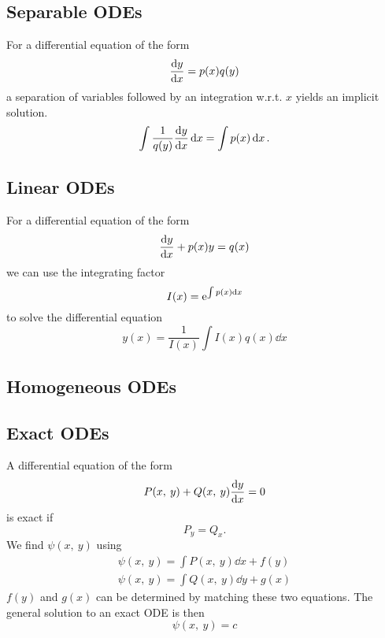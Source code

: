 \documentclass{article}
\begin{document}
\subsection{Separable ODEs}
For a differential equation of the form
\begin{equation*}
    \dv{y}{x} = p(x) q(y)
\end{equation*}
a separation of variables followed by an integration w.r.t. $x$ yields an implicit solution.
\begin{equation*}
    \int \frac{1}{q(y)} \dv{y}{x} \dd{x} = \int p(x) \dd{x}.
\end{equation*}
\subsection{Linear ODEs}
For a differential equation of the form
\begin{equation*}
    \dv{y}{x} + p(x)y = q(x)
\end{equation*}
we can use the integrating factor
\begin{equation*}
    I(x) = \mathrm{e}^{\int p(x) \dd{x}}
\end{equation*}
to solve the differential equation
\begin{equation*}
    y(x) = \frac{1}{I(x)} \int I(x) q(x) \dd{x}
\end{equation*}
\subsection{Homogeneous ODEs}
\subsection{Exact ODEs}
A differential equation of the form
\begin{equation*}
    P(x,\: y) + Q(x,\: y)\dv{y}{x} = 0
\end{equation*}
is exact if
\begin{equation*}
    P_y = Q_x.
\end{equation*}
We find $\psi(x,\: y)$ using
\begin{gather*}
    \psi(x,\: y) = \int P(x,\: y) \dd{x} + f(y) \\
    \psi(x,\: y) = \int Q(x,\: y) \dd{y} + g(x)
\end{gather*}
$f(y)$ and $g(x)$ can be determined by matching these two equations.
The general solution to an exact ODE is then
\begin{equation*}
    \psi(x,\: y) = c
\end{equation*}
\newpage
\end{document}
